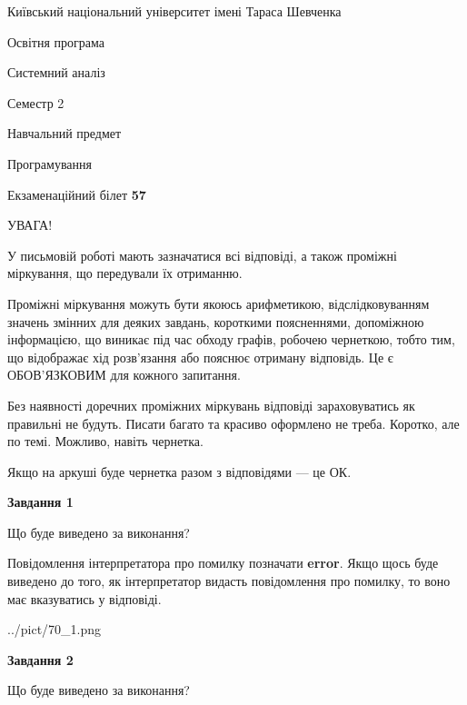 \documentclass[12pt, ukrainian]{article}
\begin{document}
{{\begin {small}\par
{ \center  Київський національний університет імені Тараса Шевченка \par}
{\parbox {5 cm}{Освітня програма \hfill}{\parbox {7 cm}{Системний аналіз \hfill}}\parbox {6 cm}{\hfill Семестр 2}}\par
{\parbox {5 cm} {Навчальний предмет \hfill}\parbox {7 cm}{Програмування \hfill}\parbox {6cm}{\hfill}\par}\vspace{-7pt} \end{small}}{\center Екзаменаційний білет \No \textbf
{ 57 }\par}}
{
\begin {large}
УВАГА!

У письмовій роботі мають зазначатися всі відповіді, а також проміжні міркування, що передували їх отриманню.

Проміжні міркування можуть бути якоюсь арифметикою, відслідковуванням зна\-чень змінних для деяких завдань,
короткими поясненнями, допоміжною інформацією, що виникає під час обходу графів, робочею чернеткою,
тобто тим, що відображає хід розв’язання або пояснює отриману відповідь.
Це є ОБОВ’ЯЗКОВИМ для кожного запитання.

Без наявності доречних проміжних міркувань відповіді зараховуватись як правиль\-ні не будуть.
Писати багато та красиво оформлено не треба. Коротко, але по темі. Можли\-во, навіть чернетка.

Якщо на аркуші буде чернетка разом з відповідями --- це ОК.

\newpage

{\begin {center}\textbf{Завдання 1}\end {center}}\par
Що буде виведено за виконання?

Повідомлення інтерпретатора про помилку позначати \textbf{error}.
Якщо щось буде виведено до того, як інтерпретатор видасть повідомлення про помилку, 
то воно має вказуватись у відповіді. \par


\begin{center}
	{../pict/70_1.png}
\end{center}
\newpage

{\begin {center}\textbf{Завдання 2}\end {center}}\par
Що буде виведено за виконання?


\end{large}}
\end{document}
